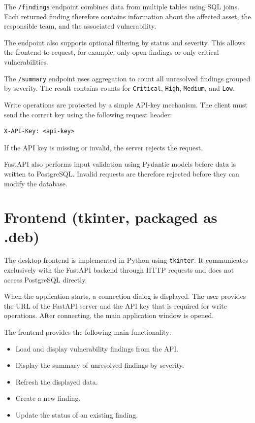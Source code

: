 \documentclass[11pt,a4paper]{article}
\begin{document}
The \texttt{/findings} endpoint combines data from multiple tables using SQL
joins. Each returned finding therefore contains information about the affected
asset, the responsible team, and the associated vulnerability.

The endpoint also supports optional filtering by status and severity. This
allows the frontend to request, for example, only open findings or only
critical vulnerabilities.

The \texttt{/summary} endpoint uses aggregation to count all unresolved
findings grouped by severity. The result contains counts for
\texttt{Critical}, \texttt{High}, \texttt{Medium}, and \texttt{Low}.

Write operations are protected by a simple API-key mechanism. The client must
send the correct key using the following request header:

\begin{verbatim}
X-API-Key: <api-key>
\end{verbatim}

If the API key is missing or invalid, the server rejects the request.

FastAPI also performs input validation using Pydantic models before data is
written to PostgreSQL. Invalid requests are therefore rejected before they can
modify the database.

\section{Frontend (tkinter, packaged as .deb)}

The desktop frontend is implemented in Python using \texttt{tkinter}. It
communicates exclusively with the FastAPI backend through HTTP requests and
does not access PostgreSQL directly.

When the application starts, a connection dialog is displayed. The user
provides the URL of the FastAPI server and the API key that is required for
write operations. After connecting, the main application window is opened.

The frontend provides the following main functionality:

\begin{itemize}[leftmargin=1.4em]
  \item Load and display vulnerability findings from the API.
  \item Display the summary of unresolved findings by severity.
  \item Refresh the displayed data.
  \item Create a new finding.
  \item Update the status of an existing finding.
\end{itemize}
\end{document}
